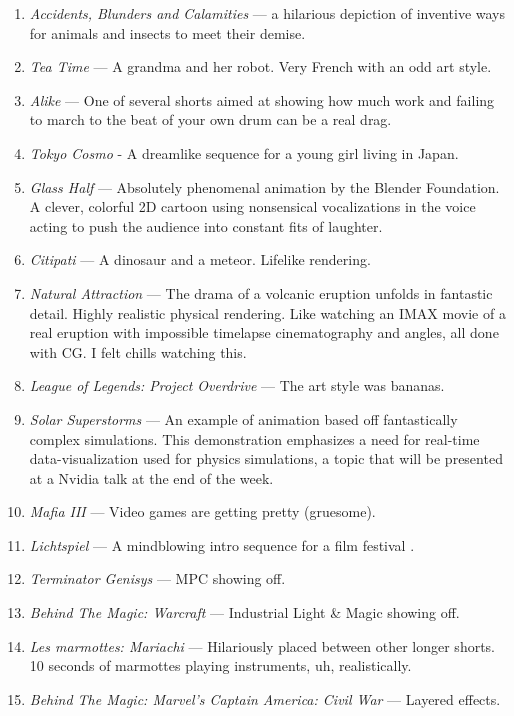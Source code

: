 \documentclass[../main.tex]{subfiles}
\begin{document}
\begin{enumerate}
	\item \textit{Accidents, Blunders and Calamities} --- a hilarious depiction of inventive ways for animals and insects to meet their demise.
	\item \textit{Tea Time} --- A grandma and her robot. Very French with an odd art style.
	\item \textit{Alike} --- One of several shorts aimed at showing how much work and failing to march to the beat of your own drum can be a real drag. 
	\item \textit{Tokyo Cosmo} - A dreamlike sequence for a young girl living in Japan.
	\item \textit{Glass Half} --- Absolutely phenomenal animation by the Blender Foundation.  A clever, colorful 2D cartoon using nonsensical vocalizations in the voice acting to push the audience into constant fits of laughter.
	\item \textit{Citipati} --- A dinosaur and a meteor. Lifelike rendering.
	\item \textit{Natural Attraction} --- The drama of a volcanic eruption unfolds in fantastic detail. Highly realistic physical rendering. Like watching an IMAX movie of a real eruption with impossible timelapse cinematography and angles, all done with CG. I felt chills watching this.
	\item \textit{League of Legends: Project Overdrive} --- The art style was bananas.
	\item \textit{Solar Superstorms} --- An example of animation based off fantastically complex simulations. This demonstration emphasizes a need for real-time data-visualization used for physics simulations, a topic that will be presented at a Nvidia talk at the end of the week.
	\item \textit{Mafia III} --- Video games are getting pretty (gruesome).
	\item \textit{Lichtspiel} --- A mindblowing intro sequence for a film festival .
	\item \textit{Terminator Genisys} --- MPC showing off.
	\item \textit{Behind The Magic: Warcraft} --- Industrial Light \& Magic showing off.
	\item \textit{Les marmottes: Mariachi} --- Hilariously placed between other longer shorts. 10 seconds of marmottes playing instruments, uh, realistically.
	\item \textit{Behind The Magic: Marvel's Captain America: Civil War} --- Layered effects.

\end{enumerate}
\end{document}
